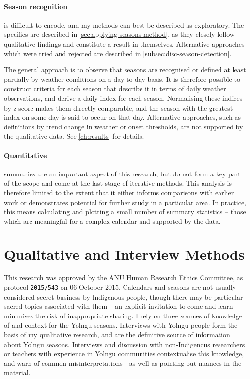 \paragraph{Season recognition} is difficult to encode, and my methods can
best be described as exploratory.  The specifics are described in
\cref{sec:applying-seasons-method}, as they closely follow qualitative
findings and constitute a result in themselves.  Alternative approaches
which were tried and rejected are described in \cref{subsec:disc-season-detection}.

The general approach is to observe that seasons are recognised or defined
at least partially by weather conditions on a day-to-day basis.  It is
therefore possible to construct criteria for each season that describe
it in terms of daily weather observations, and derive a daily index for
each season.  Normalising these indices by z-score makes them directly
comparable, and the season with the greatest index on some day is said
to occur on that day.
%
Alternative approaches, such as definitions by trend change in weather
or onset thresholds, are not supported by the qualitative data.  See
\cref{ch:results} for details.


\paragraph{Quantitative} summaries are an important aspect of this
research, but do not form a key part of the scope and come at the
last stage of iterative methods.  This analysis is therefore
limited to the extent that it either informs comparisons with earlier work
or demonstrates potential for further study in a particular area.
In practice, this means calculating and plotting a small number of summary statistics
-- those which are meaningful for a complex calendar and supported by the
data.



\section{Qualitative and Interview Methods}

This research was approved by the ANU Human Research Ethics Committee,
as protocol \texttt{2015/543} on 06 October 2015.
Calendars and seasons are not usually considered secret business by Indigenous people, though
there may be particular sacred topics associated with them -- an explicit
invitation to come and learn minimises the risk of inappropriate sharing.
%
I rely on three sources of knowledge of and context for the Yolngu
seasons.  Interviews with Yolngu people form the basis of my qualitative
research, and are the definitive source of information about Yolngu seasons.
Interviews and discussion with non-Indigenous researchers or teachers with
experience in Yolngu communities contextualise this knowledge, and warn of
common misinterpretations - as well as pointing out nuances in the material.

